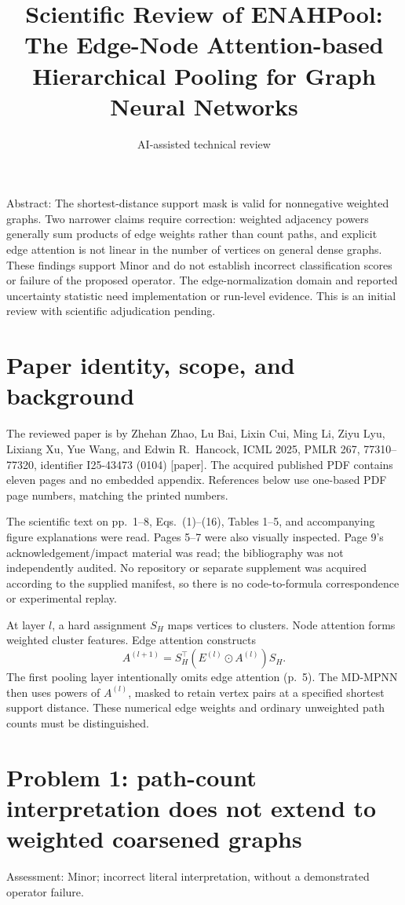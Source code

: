 \documentclass[10pt]{article}
\title{Scientific Review of
ENAHPool: The Edge-Node Attention-based Hierarchical Pooling for Graph Neural Networks}
\author{AI-assisted technical review}
\date{}
\begin{document}
\maketitle
Abstract: The shortest-distance support mask is valid for nonnegative weighted graphs. Two narrower claims require correction: weighted adjacency powers generally sum products of edge weights rather than count paths, and explicit edge attention is not linear in the number of vertices on general dense graphs. These findings support Minor and do not establish incorrect classification scores or failure of the proposed operator. The edge-normalization domain and reported uncertainty statistic need implementation or run-level evidence. This is an initial review with scientific adjudication pending.\par
\section*{Paper identity, scope, and background}
The reviewed paper is by Zhehan Zhao, Lu Bai, Lixin Cui, Ming Li, Ziyu Lyu, Lixiang Xu, Yue Wang, and Edwin R. Hancock, ICML 2025, PMLR 267, 77310–77320, identifier I25-43473 (0104) [paper]. The acquired published PDF contains eleven pages and no embedded appendix. References below use one-based PDF page numbers, matching the printed numbers.\par
The scientific text on pp. 1–8, Eqs. (1)–(16), Tables 1–5, and accompanying figure explanations were read. Pages 5–7 were also visually inspected. Page 9’s acknowledgement/impact material was read; the bibliography was not independently audited. No repository or separate supplement was acquired according to the supplied manifest, so there is no code-to-formula correspondence or experimental replay.\par
At layer \(l\), a hard assignment \(S_H\) maps vertices to clusters. Node attention forms weighted cluster features. Edge attention constructs \[A^{(l+1)}=S_H^\top(E^{(l)}\odot A^{(l)})S_H.\] The first pooling layer intentionally omits edge attention (p. 5). The MD-MPNN then uses powers of \(A^{(l)}\), masked to retain vertex pairs at a specified shortest support distance. These numerical edge weights and ordinary unweighted path counts must be distinguished.\par
\section*{Problem 1: path-count interpretation does not extend to weighted coarsened graphs}
Assessment: Minor; incorrect literal interpretation, without a demonstrated operator failure.\par
\end{document}
